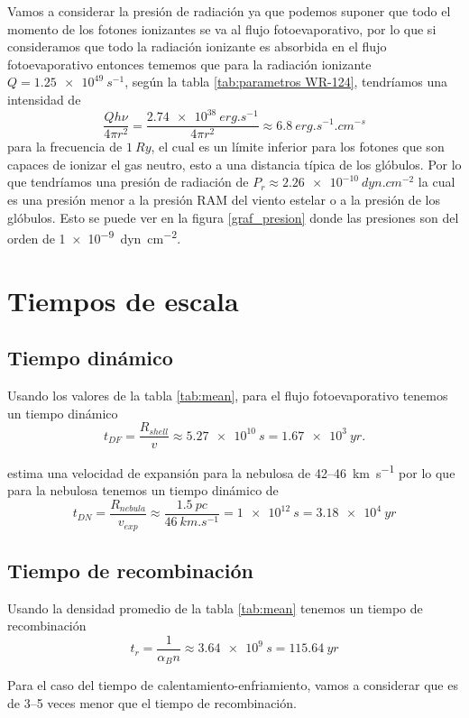 \documentclass{book}
\begin{document}
Vamos a considerar la presión de radiación ya que podemos suponer que todo el momento de los fotones ionizantes se va al flujo fotoevaporativo, por lo que si consideramos que todo la radiación ionizante es absorbida en el flujo fotoevaporativo entonces tememos que para la radiación ionizante $Q = \SI{1.25e49}{s^{-1}}$, según la tabla \ref{tab:parametros WR-124}, tendríamos una intensidad de \[\frac{Q h\nu}{4\pi r^2} = \frac{\SI{2.74e38}{erg.s^{-1}}}{4\pi r^2} \approx \SI{6.8}{erg.s^{-1}.cm^{-s}}\] para la frecuencia de $\SI{1}{Ry}$, el cual es un límite inferior para los fotones que son capaces de ionizar el gas neutro, esto a una distancia típica de los glóbulos. Por lo que tendríamos una presión de radiación de $P_r\approx \SI{2.26e-10}{dyn.cm^{-2}}$ la cual es una presión menor a la presión RAM del viento estelar o a la presión de los glóbulos. Esto se puede ver en la figura \ref{graf_presion} donde las presiones son del orden de \SI{1e-9}{dyn.cm^{-2}}.

\chapter{Tiempos de escala}

\section{Tiempo dinámico}

Usando los valores de la tabla \ref{tab:mean}, para el flujo fotoevaporativo tenemos un tiempo dinámico \[t_{DF} = \frac{R_{shell}}{v} \approx \SI{5.27e10}{s}  = \SI{1.67e3}{yr}.\]

\cite{Mancherko:2010} estima una velocidad de expansión para la nebulosa de 42--\SI{46}{km.s^{-1}} por lo que para la nebulosa tenemos un tiempo dinámico de \[t_{DN}= \frac{R_{nebula}}{v_{exp}}\approx\frac{\SI{1.5}{pc}}{\SI{46}{km.s^{-1}}}= \SI{1e12}{s}=\SI{3.18e4}{yr}\]

\section{Tiempo de recombinación}

Usando la densidad promedio de la tabla \ref{tab:mean} tenemos un tiempo de recombinación 
\[t_r = \frac{1}{\alpha_B n} \approx \SI{3.64e9}{s}= \SI{115.64}{yr}\]

Para el caso del tiempo de calentamiento-enfriamiento, vamos a considerar que es de 3--5 veces menor que el tiempo de recombinación.
\end{document}
